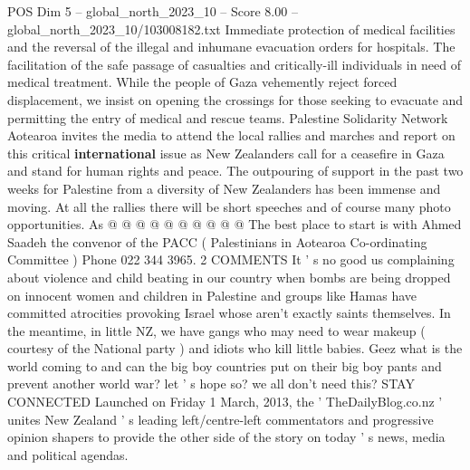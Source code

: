 \begin{textsample}{POS Dim 5 – global\_north\_2023\_10 – Score 8.00 – global\_north\_2023\_10/103008182.txt}
Immediate protection of medical facilities and the reversal of the illegal and inhumane evacuation orders for hospitals.
The facilitation of the safe passage of casualties and critically-ill individuals in need of medical treatment.
While the people of Gaza vehemently reject forced displacement, we insist on opening the crossings for those seeking to evacuate and permitting the entry of medical and rescue teams.
Palestine Solidarity Network Aotearoa invites the media to attend the local rallies and marches and report on this critical \textbf{international} issue as New Zealanders call for a ceasefire in Gaza and stand for human rights and peace.
The outpouring of support in the past two weeks for Palestine from a diversity of New Zealanders has been immense and moving.
At all the rallies there will be short speeches and of course many photo opportunities.
As @ @ @ @ @ @ @ @ @ @ The best place to start is with Ahmed Saadeh the convenor of the PACC ( Palestinians in Aotearoa Co-ordinating Committee ) Phone 022 344 3965. 2 COMMENTS It ' s no good us complaining about violence and child beating in our country when bombs are being dropped on innocent women and children in Palestine and groups like Hamas have committed atrocities provoking Israel whose aren't exactly saints themselves.
In the meantime, in little NZ, we have gangs who may need to wear makeup ( courtesy of the National party ) and idiots who kill little babies.
Geez what is the world coming to and can the big boy countries put on their big boy pants and prevent another world war? let ' s hope so? we all don't need this?
STAY CONNECTED Launched on Friday 1 March, 2013, the ' TheDailyBlog.co.nz ' unites New Zealand ' s leading left/centre-left commentators and progressive opinion shapers to provide the other side of the story on today ' s news, media and political agendas.

\end{textsample}
